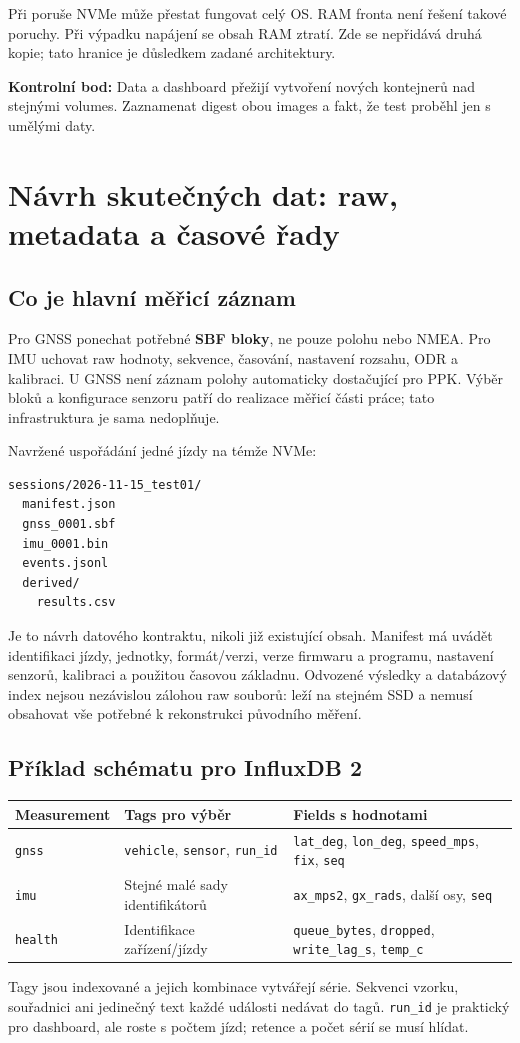 \documentclass[11pt,a4paper]{article}
\newcommand{\kontrola}[1]{\par\noindent\textbf{Kontrolní bod:} #1\par}
\begin{document}
Při poruše NVMe může přestat fungovat celý OS. RAM fronta není řešení takové poruchy. Při výpadku napájení se obsah RAM ztratí. Zde se nepřidává druhá kopie; tato hranice je důsledkem zadané architektury.

\kontrola{Data a dashboard přežijí vytvoření nových kontejnerů nad stejnými volumes. Zaznamenat digest obou images a fakt, že test proběhl jen s umělými daty.}

\clearpage
\section{Návrh skutečných dat: raw, metadata a časové řady}
\subsection{Co je hlavní měřicí záznam}
Pro GNSS ponechat potřebné \textbf{SBF bloky}, ne pouze polohu nebo NMEA. Pro IMU uchovat raw hodnoty, sekvence, časování, nastavení rozsahu, ODR a kalibraci. U GNSS není záznam polohy automaticky dostačující pro PPK. Výběr bloků a konfigurace senzoru patří do realizace měřicí části práce; tato infrastruktura je sama nedoplňuje.\cite{projekt}

Navržené uspořádání jedné jízdy na témže NVMe:
\begin{lstlisting}
sessions/2026-11-15_test01/
  manifest.json
  gnss_0001.sbf
  imu_0001.bin
  events.jsonl
  derived/
    results.csv
\end{lstlisting}
Je to návrh datového kontraktu, nikoli již existující obsah. Manifest má uvádět identifikaci jízdy, jednotky, formát/verzi, verze firmwaru a programu, nastavení senzorů, kalibraci a použitou časovou základnu. Odvozené výsledky a databázový index nejsou nezávislou zálohou raw souborů: leží na stejném SSD a nemusí obsahovat vše potřebné k rekonstrukci původního měření.

\subsection{Příklad schématu pro InfluxDB 2}
\par\noindent\begin{tabularx}{\textwidth}{L{31mm}Y Y}
\toprule Measurement & Tags pro výběr & Fields s hodnotami\\\midrule
\texttt{gnss} & \texttt{vehicle}, \texttt{sensor}, \texttt{run\_id} & \texttt{lat\_deg}, \texttt{lon\_deg}, \texttt{speed\_mps}, \texttt{fix}, \texttt{seq}\\\addlinespace
\texttt{imu} & Stejné malé sady identifikátorů & \texttt{ax\_mps2}, \texttt{gx\_rads}, další osy, \texttt{seq}\\\addlinespace
\texttt{health} & Identifikace zařízení/jízdy & \texttt{queue\_bytes}, \texttt{dropped}, \texttt{write\_lag\_s}, \texttt{temp\_c}\\
\bottomrule\end{tabularx}\par
Tagy jsou indexované a jejich kombinace vytvářejí série. Sekvenci vzorku, souřadnici ani jedinečný text každé události nedávat do tagů. \texttt{run\_id} je praktický pro dashboard, ale roste s počtem jízd; retence a počet sérií se musí hlídat.\cite{influx-schema}
\end{document}
